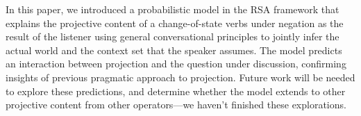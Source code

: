 In this paper, we introduced a probabilistic model in the RSA framework 
 that explains the projective content of a change-of-state verbs under negation
 as the result of the listener using general conversational principles to jointly infer the actual world and the context set that the speaker assumes.
The model predicts an interaction between projection and the question under discussion, confirming 
 insights of previous pragmatic approach to projection. 
 Future work will be needed to explore these predictions, and determine whether the model extends to other projective content from other operators---we haven't finished these explorations.
 

